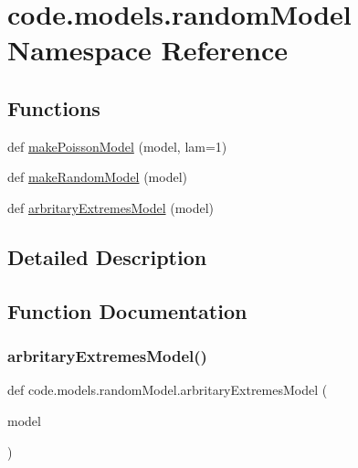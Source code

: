 \hypertarget{namespacecode_1_1models_1_1random_model}{}\section{code.\+models.\+random\+Model Namespace Reference}
\label{namespacecode_1_1models_1_1random_model}
\subsection*{Functions}
\begin{DoxyCompactItemize}
\item 
def \hyperlink{namespacecode_1_1models_1_1random_model_a53965ea5d04003536da24d54238b7b4e}{make\+Poisson\+Model} (model, lam=1)
\item 
def \hyperlink{namespacecode_1_1models_1_1random_model_aacad6bd46fc822773672369bd2b96304}{make\+Random\+Model} (model)
\item 
def \hyperlink{namespacecode_1_1models_1_1random_model_a9000a1a9c38b2aa563310e6b73a0665f}{arbritary\+Extremes\+Model} (model)
\end{DoxyCompactItemize}


\subsection{Detailed Description}
\begin{DoxyVerb}\end{DoxyVerb}
 

\subsection{Function Documentation}
\mbox{\label{namespacecode_1_1models_1_1random_model_a9000a1a9c38b2aa563310e6b73a0665f}} 
\subsubsection{\texorpdfstring{arbritary\+Extremes\+Model()}{arbritaryExtremesModel()}}
{\footnotesize\ttfamily def code.\+models.\+random\+Model.\+arbritary\+Extremes\+Model (\begin{DoxyParamCaption}\item[{}]{model }\end{DoxyParamCaption})}

